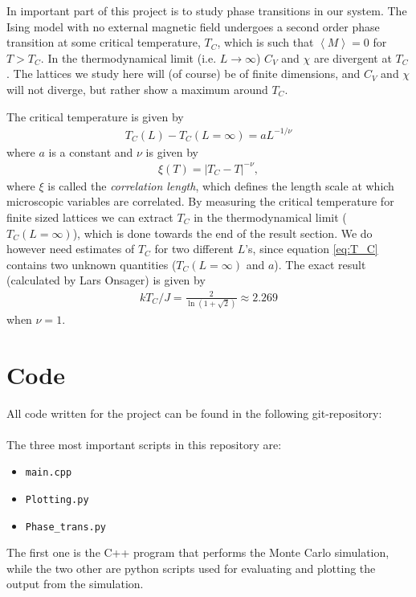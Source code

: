 \documentclass[12pt, a4paper]{article}
\begin{document}
In important part of this project is to study phase transitions in our system. The Ising model with 
no external magnetic field undergoes a second order phase transition at some critical temperature, $T_C$, 
which is such that $\left\langle M \right\rangle=0$ for $T>T_C$. In the thermodynamical limit 
(i.e. $L\rightarrow\infty$) $C_V$ and $\chi$ are divergent at $T_C$. The lattices we study here will 
(of course) be of finite dimensions, and  $C_V$ and $\chi$ will not diverge, but rather show a 
maximum around $T_C$. 

The critical temperature is given by  
\begin{align}
T_C(L) - T_C(L=\infty) = aL^{-1/\nu}
\label{eq:T_C}
\end{align}
where $a$ is a constant and $\nu$ is given by 
\begin{align*}
\xi(T) = |T_C - T|^{-\nu}, 
\end{align*}
where $\xi$ is called the \textit{correlation length}, which defines the length scale at which microscopic 
variables are correlated. By measuring the critical temperature for finite sized lattices we can 
extract $T_C$ in the thermodynamical limit ($T_C(L=\infty)$), which is done towards the end of the 
result section. We do 
however need estimates of $T_C$ for two different $L$'s, since equation \ref{eq:T_C} contains two 
unknown quantities ($T_C(L=\infty)$ and $a$). The exact result (calculated by Lars Onsager) is given by 
\begin{align}
k T_C/J = \frac{2}{\ln(1+ \sqrt{2})} \approx 2.269
\end{align}
when $\nu = 1$. 

\section{Code}

All code written for the project can be found in the following git-repository:  \vspace{0.5cm} \\ 
 \vspace{0.5cm} \\ 
The three most important scripts in this repository are: 
\begin{itemize}
\item \texttt{main.cpp}
\item \texttt{Plotting.py}
\item \texttt{Phase\_trans.py}
\end{itemize}
The first one is the C++ program that performs the Monte Carlo simulation, while the two other are 
python scripts used for evaluating and plotting the output from the simulation. 
\end{document}
